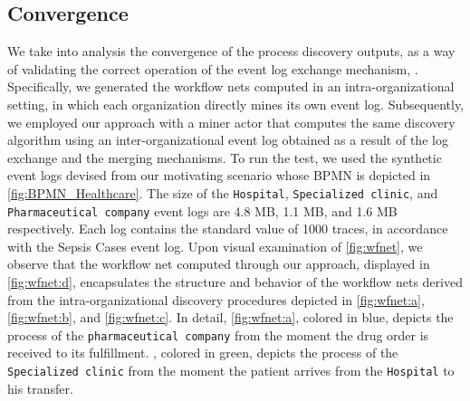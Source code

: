 \subsection{Convergence}
\label{sec:discussion:subsec:convergence}  

We take into analysis the convergence of the process discovery outputs, as a way of validating the correct operation of the event log exchange mechanism, . Specifically, we generated the workflow nets computed in an intra-organizational setting, in which each organization directly mines its own event log. Subsequently, we employed our approach with a miner actor that computes the same discovery algorithm using an inter-organizational event log obtained as a result of the log exchange and the merging mechanisms. To run the test, we used the synthetic event logs devised from our motivating scenario whose BPMN is depicted in \cref{fig:BPMN_Healthcare}. The size of the \texttt{Hospital}, \texttt{Specialized clinic}, and \texttt{Pharmaceutical company} event logs are 4.8 MB, 1.1 MB, and 1.6 MB respectively.  Each log contains the standard value of 1000 traces, in accordance with the Sepsis Cases \cite{sepsis} event log. Upon visual examination of \cref{fig:wfnet}, we observe that the workflow net computed through our approach, displayed in \cref{fig:wfnet:d}, encapsulates the structure and behavior of the workflow nets derived from the intra-organizational discovery procedures depicted in \cref{fig:wfnet:a},\cref{fig:wfnet:b}, and \cref{fig:wfnet:c}. %
In detail, \cref{fig:wfnet:a}, colored in blue, depicts the process of the \texttt{pharmaceutical company} from the moment the drug order is received to its fulfillment. , colored in green, depicts the process of the \texttt{Specialized clinic} from the moment the patient arrives from the \texttt{Hospital} to his transfer.



